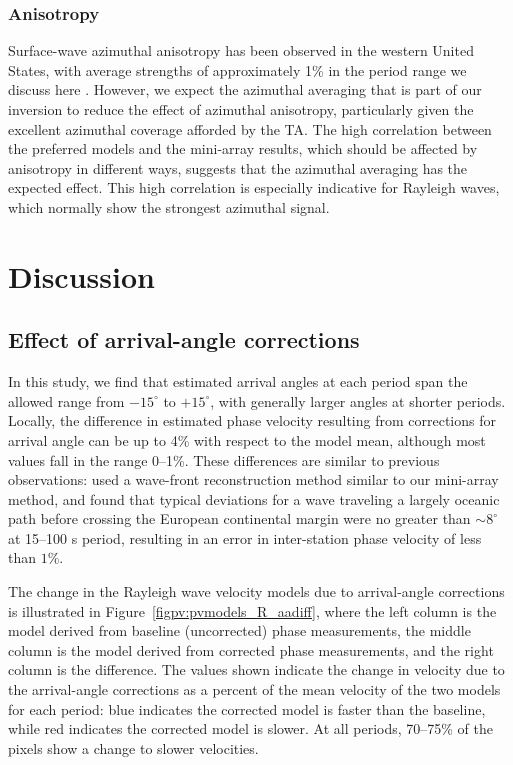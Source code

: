 \documentclass[12pt,oneside]{book}
\newcommand{\degree}[1]{\mbox{$#1^{\circ}$}}
\begin{document}
\subsubsection*{Anisotropy}

Surface-wave azimuthal anisotropy has been observed in the western United States, with average strengths of approximately 1\% in the period range we discuss here \citep[e.g.,][]{Marone2007,Beghein2010}. However, we expect the azimuthal averaging that is part of our inversion to reduce the effect of azimuthal anisotropy, particularly given the excellent azimuthal coverage afforded by the TA. The high correlation between the preferred models and the mini-array results, which should be affected by anisotropy in different ways, suggests that the azimuthal averaging has the expected effect. This high correlation is especially indicative for Rayleigh waves, which normally show the strongest azimuthal signal. 

\section{Discussion}

\subsection{Effect of arrival-angle corrections}\label{sec:aadiff}

In this study, we find that estimated arrival angles at each period span the allowed range from \degree{-15} to \degree{+15}, with generally larger angles at shorter periods. Locally, the difference in estimated phase velocity resulting from corrections for arrival angle can be up to 4\% with respect to the model mean, although most values fall in the range 0\nobreakdash--1\%. These differences are similar to previous observations: \citet{Alsina1993} used a wave-front reconstruction method similar to our mini-array method, and found that typical deviations for a wave traveling a largely oceanic path before crossing the European continental margin were no greater than $\sim$\degree{8} at 15--100 s period, resulting in an error in inter-station phase velocity of less than $1\%$. 

The change in the Rayleigh wave velocity models due to arrival-angle corrections is illustrated in Figure~\ref{figpv:pvmodels_R_aadiff}, where the left column is the model derived from baseline (uncorrected) phase measurements, the middle column is the model derived from corrected phase measurements, and the right column is the difference. The values shown indicate the change in velocity due to the arrival-angle corrections as a percent of the mean velocity of the two models for each period: blue indicates the corrected model is faster than the baseline, while red indicates the corrected model is slower. At all periods, 70--75\% of the pixels show a change to slower velocities. 
\end{document}
